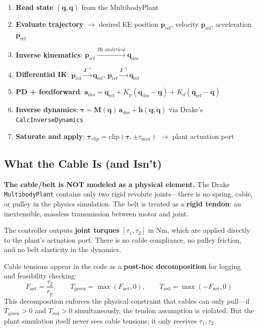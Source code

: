 \documentclass[11pt,a4paper]{article}
\newcommand{\bq}{\bm{q}}
\newcommand{\btau}{\bm{\tau}}
\newcommand{\bM}{\bm{M}}
\newcommand{\bh}{\bm{h}}
\newcommand{\bJ}{\bm{J}}
\begin{document}
\begin{enumerate}[leftmargin=2em]
    \item \textbf{Read state} $(\bq, \dot{\bq})$ from the MultibodyPlant
    \item \textbf{Evaluate trajectory} $\to$ desired EE position $\bm{p}_{\mathrm{ref}}$, velocity $\dot{\bm{p}}_{\mathrm{ref}}$, acceleration $\ddot{\bm{p}}_{\mathrm{ref}}$
    \item \textbf{Inverse kinematics}: $\bm{p}_{\mathrm{ref}} \xrightarrow{\text{2R analytical}} \bq_{\mathrm{des}}$
    \item \textbf{Differential IK}: $\dot{\bm{p}}_{\mathrm{ref}} \xrightarrow{\bJ^{-1}} \dot{\bq}_{\mathrm{ref}}$, \quad $\ddot{\bm{p}}_{\mathrm{ref}} \xrightarrow{\bJ^{-1}} \ddot{\bq}_{\mathrm{ref}}$
    \item \textbf{PD + feedforward}: $\bm{a}_{\mathrm{des}} = \ddot{\bq}_{\mathrm{ref}} + K_p(\bq_{\mathrm{des}} - \bq) + K_d(\dot{\bq}_{\mathrm{ref}} - \dot{\bq})$
    \item \textbf{Inverse dynamics}: $\btau = \bM(\bq)\,\bm{a}_{\mathrm{des}} + \bh(\bq, \dot{\bq})$ \quad via Drake's \texttt{CalcInverseDynamics}
    \item \textbf{Saturate and apply}: $\btau_{\mathrm{clip}} = \mathrm{clip}(\btau, \pm\tau_{\max})$ $\to$ plant actuation port
\end{enumerate}

\subsection{What the Cable Is (and Isn't)}

\begin{warnbox}
\textbf{The cable/belt is NOT modeled as a physical element.}  The Drake \texttt{MultibodyPlant} contains only two rigid revolute joints---there is no spring, cable, or pulley in the physics simulation.  The belt is treated as a \textbf{rigid tendon}: an inextensible, massless transmission between motor and joint.
\end{warnbox}

The controller outputs \textbf{joint torques} $[\tau_1, \tau_2]$ in Nm, which are applied directly to the plant's actuation port.  There is no cable compliance, no pulley friction, and no belt elasticity in the dynamics.

Cable tensions appear in the code as a \textbf{post-hoc decomposition} for logging and feasibility checking:
\[
    F_{\mathrm{net}} = \frac{\tau_2}{r_p}, \qquad
    T_{\mathrm{green}} = \max(F_{\mathrm{net}}, 0), \qquad
    T_{\mathrm{red}} = \max(-F_{\mathrm{net}}, 0)
\]
This decomposition enforces the physical constraint that cables can only pull---if $T_{\mathrm{green}} > 0$ and $T_{\mathrm{red}} > 0$ simultaneously, the tendon assumption is violated.  But the plant simulation itself never sees cable tensions; it only receives $\tau_1, \tau_2$.
\end{document}
